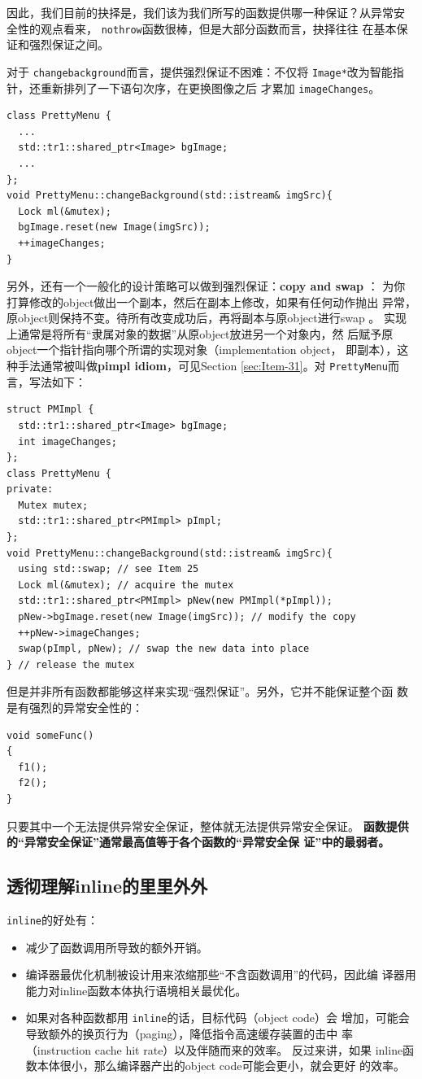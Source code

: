 \documentclass[a4paper,twoside]{article}
\theoremstyle{definition}
\theoremstyle{remark}
\numberwithin{equation}{section}
\let\OldTexttt\texttt
\renewcommand{\texttt}[1]{{\color{blue} \OldTexttt{#1}}}
\begin{document}
因此，我们目前的抉择是，我们该为我们所写的函数提供哪一种保证？从异常安
全性的观点看来，\texttt{nothrow}函数很棒，但是大部分函数而言，抉择往往
在基本保证和强烈保证之间。

对于\texttt{changebackground}而言，提供强烈保证不困难：不仅将
\texttt{Image*}改为智能指针，还重新排列了一下语句次序，在更换图像之后
才累加\texttt{imageChanges}。
\begin{verbatim}
class PrettyMenu {
  ...
  std::tr1::shared_ptr<Image> bgImage;
  ...
};
void PrettyMenu::changeBackground(std::istream& imgSrc){
  Lock ml(&mutex);
  bgImage.reset(new Image(imgSrc));
  ++imageChanges;
}
\end{verbatim}

另外，还有一个一般化的设计策略可以做到强烈保证：\textbf{copy and swap}
： 
为你打算修改的object做出一个副本，然后在副本上修改，如果有任何动作抛出
异常，原object则保持不变。待所有改变成功后，再将副本与原object进行swap
。 实现上通常是将所有“隶属对象的数据”从原object放进另一个对象内，然
后赋予原object一个指针指向哪个所谓的实现对象（implementation object，
即副本），这种手法通常被叫做\textbf{pimpl idiom}，可见Section
\ref{sec:Item-31}。对\texttt{PrettyMenu}而言，写法如下：
\begin{verbatim}
struct PMImpl { 
  std::tr1::shared_ptr<Image> bgImage;
  int imageChanges; 
};
class PrettyMenu {
private:
  Mutex mutex;
  std::tr1::shared_ptr<PMImpl> pImpl;
};
void PrettyMenu::changeBackground(std::istream& imgSrc){
  using std::swap; // see Item 25
  Lock ml(&mutex); // acquire the mutex
  std::tr1::shared_ptr<PMImpl> pNew(new PMImpl(*pImpl));
  pNew->bgImage.reset(new Image(imgSrc)); // modify the copy
  ++pNew->imageChanges;
  swap(pImpl, pNew); // swap the new data into place
} // release the mutex
\end{verbatim}

但是并非所有函数都能够这样来实现“强烈保证”。另外，它并不能保证整个函
数是有强烈的异常安全性的：
\begin{verbatim}
void someFunc()
{
  f1();
  f2();
}
\end{verbatim}
只要其中一个无法提供异常安全保证，整体就无法提供异常安全保证。
\textbf{函数提供的“异常安全保证”通常最高值等于各个函数的“异常安全保
  证”中的最弱者。}

\subsection{透彻理解inline的里里外外}
\label{sec:Item-30}

\texttt{inline}的好处有：
\begin{itemize}
\item 减少了函数调用所导致的额外开销。
\item 编译器最优化机制被设计用来浓缩那些“不含函数调用”的代码，因此编
  译器用能力对inline函数本体执行语境相关最优化。
\item 如果对各种函数都用\texttt{inline}的话，目标代码（object code）会
  增加，可能会导致额外的换页行为（paging），降低指令高速缓存装置的击中
  率（instruction cache hit rate）以及伴随而来的效率。 反过来讲，如果
  inline函数本体很小，那么编译器产出的object code可能会更小，就会更好
  的效率。
\end{itemize}
\end{document}
